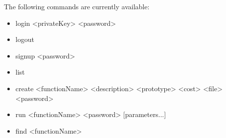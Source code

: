 The following commands are currently available:
\begin{itemize}
	\item login <privateKey> <password>
	\item logout
	\item signup <password>
	\item list
	\item create <functionName> <description> <prototype> <cost> <file> <password>
	\item run <functionName> <password> [parameters...]
	\item find <functionName>
\end{itemize}


